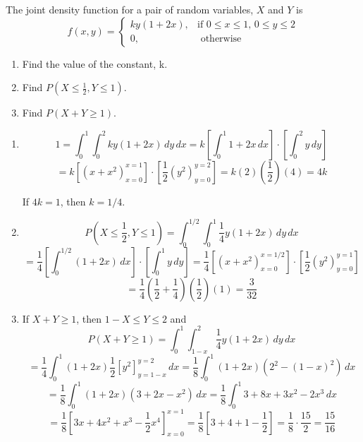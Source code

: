 \begin{Exercise}[title = {Joint Density Functions}, label = joint]
The joint density function for a pair of random variables, $X$ and $Y$ is
$$f(x, y) = 
\begin{cases}
	ky(1 + 2x),& \text{if } 0 \leq x \leq 1\text{, }0 \leq y \leq 2\\
	0,&\text{ otherwise}
\end{cases}$$
\begin{enumerate}
\item Find the value of the constant, k.
\item Find $P(X \leq \frac{1}{2}, Y \leq 1)$.
\item Find $P(X + Y \geq 1)$.
\end{enumerate}
\end{Exercise}

\begin{Answer}[ref = joint]
\begin{enumerate}
    \item $$1 = \int_0^1 \int_0^2 ky\left(1 + 2x \right)\,dy\,dx = k \left[ 
    \int_0^1 1 + 2x\,dx \right] \cdot \left[ \int_0^2 y \,dy \right]$$
    $$= k \left[ \left(x + x^2 \right)_{x = 0}^{x = 1} \right] \cdot \left[ 
    \frac{1}{2} \left( y^2 \right)_{y = 0}^{y = 2} \right] = k \left( 2 \right)
    \left( \frac{1}{2} \right) \left(4 \right) = 4k$$

    If $4k = 1$, then $k = 1/4$. 

    \item $$P(X \leq \frac{1}{2}, Y \leq 1) = \int_0^{1/2} \int_0^1 \frac{1}{4}
    y \left(1 + 2x \right)\,dy\,dx$$
    $$= \frac{1}{4} \left[ \int_0^{1/2} \left(1 + 2x \right)\,dx \right] \cdot 
    \left[ \int_0^1 y\,dy \right] = \frac{1}{4} \left[ \left(x + x^2 \right)_{
    x = 0}^{x = 1/2} \right] \cdot \left[ \frac{1}{2} \left(y^2 \right)_{y = 0}
    ^{y = 1} \right]$$
    $$= \frac{1}{4} \left( \frac{1}{2} + \frac{1}{4} \right) \left( \frac{1}{2}
    \right) \left( 1 \right) = \frac{3}{32}$$

    \item If $X + Y \geq 1$, then $1 - X \leq Y \leq 2$ and 
    $$P(X + Y \geq 1 ) = \int_0^1 \int_{1 - x}^2 \frac{1}{4} y \left(1 + 2x 
    \right)\,dy\,dx$$
    $$= \frac{1}{4} \int_0^1 \left(1 + 2x \right) \frac{1}{2} \left[y^2 \right]
    _{y = 1 - x}^{y = 2}\,dx = \frac{1}{8} \int_0^1 \left(1 + 2x \right) \left(
    2^2 - \left(1 - x \right)^2 \right)\,dx$$
    $$= \frac{1}{8} \int_0^1 \left(1 + 2x \right) \left(3 + 2x - x^2 \right)\,
    dx = \frac{1}{8} \int_0^1 3 + 8x + 3x^2 - 2x^3\,dx$$
    $$= \frac{1}{8} \left[ 3x + 4x^2 + x^3 - \frac{1}{2}x^4 \right]_{x = 0}^{x 
    = 1} = \frac{1}{8} \left[3 + 4 + 1 - \frac{1}{2} \right] = \frac{1}{8} 
    \cdot \frac{15}{2} = \frac{15}{16}$$
\end{enumerate}
\end{Answer}

